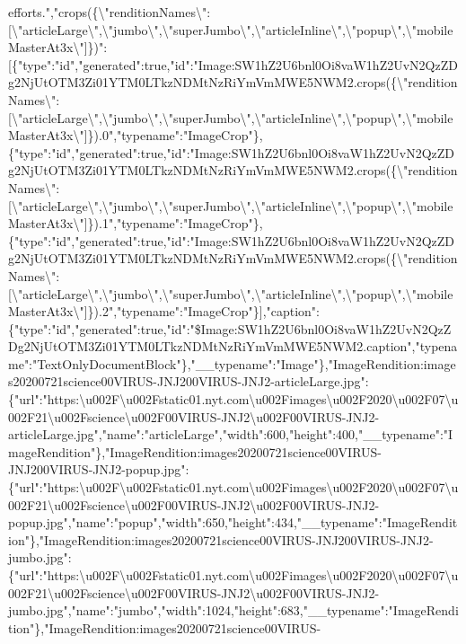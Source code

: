 efforts.","crops(\{\textbackslash{}"renditionNames\textbackslash{}":{[}\textbackslash{}"articleLarge\textbackslash{}",\textbackslash{}"jumbo\textbackslash{}",\textbackslash{}"superJumbo\textbackslash{}",\textbackslash{}"articleInline\textbackslash{}",\textbackslash{}"popup\textbackslash{}",\textbackslash{}"mobileMasterAt3x\textbackslash{}"{]}\})":{[}\{"type":"id","generated":true,"id":"Image:SW1hZ2U6bnl0Oi8vaW1hZ2UvN2QzZDg2NjUtOTM3Zi01YTM0LTkzNDMtNzRiYmVmMWE5NWM2.crops(\{\textbackslash{}"renditionNames\textbackslash{}":{[}\textbackslash{}"articleLarge\textbackslash{}",\textbackslash{}"jumbo\textbackslash{}",\textbackslash{}"superJumbo\textbackslash{}",\textbackslash{}"articleInline\textbackslash{}",\textbackslash{}"popup\textbackslash{}",\textbackslash{}"mobileMasterAt3x\textbackslash{}"{]}\}).0","typename":"ImageCrop"\},\{"type":"id","generated":true,"id":"Image:SW1hZ2U6bnl0Oi8vaW1hZ2UvN2QzZDg2NjUtOTM3Zi01YTM0LTkzNDMtNzRiYmVmMWE5NWM2.crops(\{\textbackslash{}"renditionNames\textbackslash{}":{[}\textbackslash{}"articleLarge\textbackslash{}",\textbackslash{}"jumbo\textbackslash{}",\textbackslash{}"superJumbo\textbackslash{}",\textbackslash{}"articleInline\textbackslash{}",\textbackslash{}"popup\textbackslash{}",\textbackslash{}"mobileMasterAt3x\textbackslash{}"{]}\}).1","typename":"ImageCrop"\},\{"type":"id","generated":true,"id":"Image:SW1hZ2U6bnl0Oi8vaW1hZ2UvN2QzZDg2NjUtOTM3Zi01YTM0LTkzNDMtNzRiYmVmMWE5NWM2.crops(\{\textbackslash{}"renditionNames\textbackslash{}":{[}\textbackslash{}"articleLarge\textbackslash{}",\textbackslash{}"jumbo\textbackslash{}",\textbackslash{}"superJumbo\textbackslash{}",\textbackslash{}"articleInline\textbackslash{}",\textbackslash{}"popup\textbackslash{}",\textbackslash{}"mobileMasterAt3x\textbackslash{}"{]}\}).2","typename":"ImageCrop"\}{]},"caption":\{"type":"id","generated":true,"id":"\$Image:SW1hZ2U6bnl0Oi8vaW1hZ2UvN2QzZDg2NjUtOTM3Zi01YTM0LTkzNDMtNzRiYmVmMWE5NWM2.caption","typename":"TextOnlyDocumentBlock"\},"\_\_typename":"Image"\},"ImageRendition:images20200721science00VIRUS-JNJ200VIRUS-JNJ2-articleLarge.jpg":\{"url":"https:\textbackslash{}u002F\textbackslash{}u002Fstatic01.nyt.com\textbackslash{}u002Fimages\textbackslash{}u002F2020\textbackslash{}u002F07\textbackslash{}u002F21\textbackslash{}u002Fscience\textbackslash{}u002F00VIRUS-JNJ2\textbackslash{}u002F00VIRUS-JNJ2-articleLarge.jpg","name":"articleLarge","width":600,"height":400,"\_\_typename":"ImageRendition"\},"ImageRendition:images20200721science00VIRUS-JNJ200VIRUS-JNJ2-popup.jpg":\{"url":"https:\textbackslash{}u002F\textbackslash{}u002Fstatic01.nyt.com\textbackslash{}u002Fimages\textbackslash{}u002F2020\textbackslash{}u002F07\textbackslash{}u002F21\textbackslash{}u002Fscience\textbackslash{}u002F00VIRUS-JNJ2\textbackslash{}u002F00VIRUS-JNJ2-popup.jpg","name":"popup","width":650,"height":434,"\_\_typename":"ImageRendition"\},"ImageRendition:images20200721science00VIRUS-JNJ200VIRUS-JNJ2-jumbo.jpg":\{"url":"https:\textbackslash{}u002F\textbackslash{}u002Fstatic01.nyt.com\textbackslash{}u002Fimages\textbackslash{}u002F2020\textbackslash{}u002F07\textbackslash{}u002F21\textbackslash{}u002Fscience\textbackslash{}u002F00VIRUS-JNJ2\textbackslash{}u002F00VIRUS-JNJ2-jumbo.jpg","name":"jumbo","width":1024,"height":683,"\_\_typename":"ImageRendition"\},"ImageRendition:images20200721science00VIRUS-